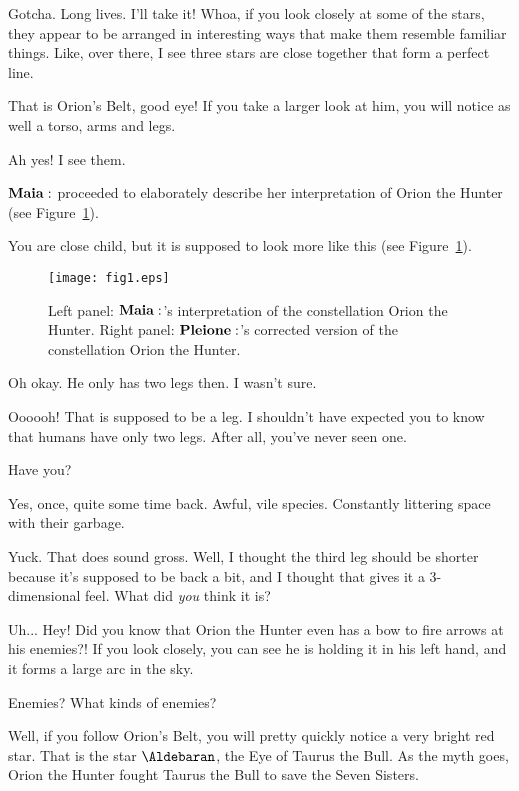 \documentclass[main.tex]{subfiles}
\begin{document}
\Maia Gotcha.  Long lives.  I'll take it!  Whoa, if you look closely at some of the stars, they appear to be arranged in interesting ways that make them resemble familiar things.  Like, over there, I see three stars are close together that form a perfect line.

\Pleione That is Orion's Belt, good eye!  If you take a larger look at him, you will notice as well a torso, arms and legs.  

\Maia Ah yes!  I see them.  

$\Maia$ proceeded to elaborately describe her interpretation of Orion the Hunter (see Figure~\ref{fig:fig1}).

\Pleione You are close child, but it is supposed to look more like this (see Figure~\ref{fig:fig1}).

\begin{figure}
\begin{center}
\texttt{[image: fig1.eps]}
\end{center}
\caption[Schematic depictions of Orion the Hunter]{Left panel:  $\Maia$'s interpretation of the constellation Orion the Hunter.  Right panel:  $\Pleione$'s corrected version of the constellation Orion the Hunter.
\label{fig:fig1}}
\end{figure}

\Maia Oh okay.  He only has two legs then.  I wasn't sure.

\Pleione Oooooh!  That is supposed to be a leg.  I shouldn't have expected you to know that humans have only two legs.  After all, you've never seen one.

\Maia Have you?

\Pleione Yes, once, quite some time back.  Awful, vile species.  Constantly littering space with their garbage.

\Maia Yuck.  That does sound gross.  Well, I thought the third leg should be shorter because it's supposed to be back a bit, and I thought that gives it a 3-dimensional feel.  What did \textit{you} think it is?

\Pleione Uh... Hey! Did you know that Orion the Hunter even has a bow to fire arrows at his enemies?!  If you look closely, you can see he is holding it in his left hand, and it forms a large arc in the sky.

\Maia Enemies?  What kinds of enemies?

\Pleione Well, if you follow Orion's Belt, you will pretty quickly notice a very bright red star.  That is the star $\Aldebaran$, the Eye of Taurus the Bull.  As the myth goes, Orion the Hunter fought Taurus the Bull to save the Seven Sisters.  
\end{document}
